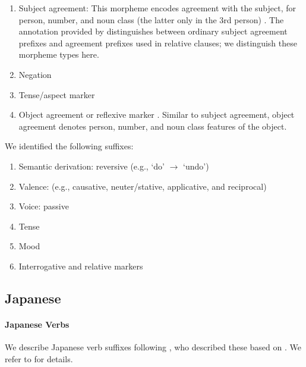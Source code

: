 \documentclass[11pt,letterpaper]{article}
\begin{document}
\begin{enumerate}
    \item Subject agreement: This morpheme encodes agreement with the subject, for person, number, and noun class (the latter only in the 3rd person) \cite[]{doke1967textbook}.
            The annotation provided by \cite{demuth1992acquisition} distinguishes between ordinary subject agreement prefixes and agreement prefixes used in relative clauses; we distinguish these morpheme types here.

    \item Negation \citep[]{doke1967textbook}

    \item Tense/aspect marker   \citep[--424]{doke1967textbook}

    \item Object agreement or reflexive marker \citep[]{doke1967textbook}.
    Similar to subject agreement, object agreement denotes person, number, and noun class features of the object.
\end{enumerate}
We identified the following suffixes:

\begin{enumerate}
\item Semantic derivation: reversive (e.g., `do' $\rightarrow$ `undo')
\item Valence: (e.g., causative, neuter/stative, applicative, and reciprocal)
    \item Voice: passive
    \item Tense
    \item Mood
    \item Interrogative and relative markers
\end{enumerate}

\subsection{Japanese}

\paragraph{Japanese Verbs}
We describe Japanese verb suffixes following \citep{Hahn2020modeling}, who described these based on \citep{kaiser2013japanese,hasegawa2014japanese}.
We refer to \citep{Hahn2020modeling} for details.
\end{document}
